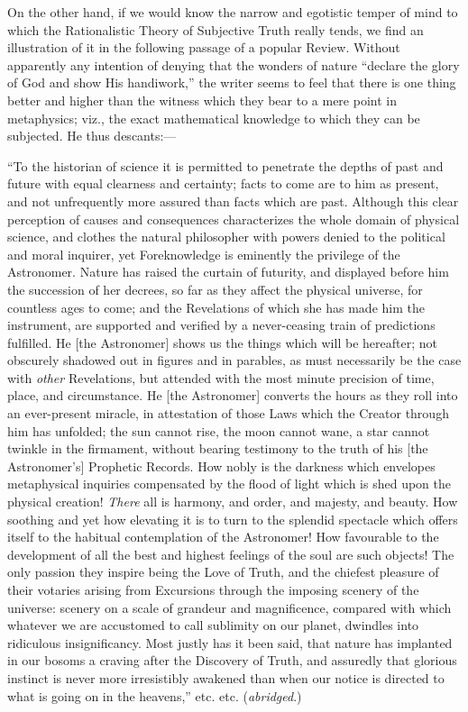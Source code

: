 On the other hand, if we would know the narrow
and egotistic temper of mind to which the Rationalistic Theory of
Subjective Truth really tends, we find an illustration of it in the
following passage of a popular Review. Without apparently any
intention of denying that the wonders of nature ``declare the glory
of God and show His handiwork,'' the writer seems to feel that there
is one thing better and higher than the witness which they bear to a
mere point in metaphysics; viz., the exact mathematical knowledge to
which they can be subjected. He thus descants:—

``To the
historian of science it is permitted to penetrate the depths of past
and future with equal clearness and certainty; facts to come are to
him as present, and not unfrequently more assured than facts which are
past. Although this clear perception of causes and consequences
characterizes the whole domain of physical science, and clothes the
natural philosopher with powers denied to the political and moral
inquirer, yet Foreknowledge is eminently the privilege of the
Astronomer. Nature has raised the curtain of futurity, and displayed
before him the succession of her decrees, so far as they affect the
physical universe, for countless ages to come; and the Revelations of
which she has made him the instrument, are supported and verified by a
never-ceasing train of predictions fulfilled. He [the Astronomer]
shows us the things which will be hereafter; not obscurely shadowed
out in figures and in parables, as must necessarily be the case with \emph{other}
Revelations, but attended with the most minute precision of time,
place, and circumstance. He
[the Astronomer] converts the hours as they roll into an ever-present
miracle, in attestation of those Laws which the Creator through him
has unfolded; the sun cannot rise, the moon cannot wane, a star cannot
twinkle in the firmament, without bearing testimony to the truth of
his [the Astronomer's] Prophetic Records. How nobly is the darkness
which envelopes metaphysical inquiries compensated by the flood of
light which is shed upon the physical creation! \emph{There} all is
harmony, and order, and majesty, and beauty. How soothing and yet how
elevating it is to turn to the splendid spectacle which offers itself
to the habitual contemplation of the Astronomer! How favourable to the
development of all the best and highest feelings of the soul are such
objects! The only passion they inspire being the Love of Truth, and
the chiefest pleasure of their votaries arising from Excursions
through the imposing scenery of the universe: scenery on a scale of
grandeur and magnificence, compared with which whatever we are
accustomed to call sublimity on our planet, dwindles into ridiculous
insignificancy. Most justly has it been said, that nature has
implanted in our bosoms a craving after the Discovery of Truth, and
assuredly that glorious instinct is never more irresistibly awakened
than when our notice is directed to what is going on in the
heavens,'' etc. etc. (\emph{abridged}.)

